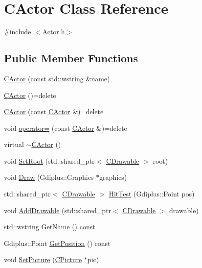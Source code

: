 \hypertarget{class_c_actor}{\section{C\+Actor Class Reference}
\label{class_c_actor}
}


{\ttfamily \#include $<$Actor.\+h$>$}

\subsection*{Public Member Functions}
\begin{DoxyCompactItemize}
\item 
\hyperlink{class_c_actor_a2849f9370b66ddeaa727c8b7045d62c2}{C\+Actor} (const std\+::wstring \&name)
\item 
\hyperlink{class_c_actor_ae7683d5f0b3edc85dc47850fa71de40f}{C\+Actor} ()=delete
\item 
\hyperlink{class_c_actor_a8af986ad4ec530967f942aaebd853632}{C\+Actor} (const \hyperlink{class_c_actor}{C\+Actor} \&)=delete
\item 
void \hyperlink{class_c_actor_aa947810cfb2f45129b501296bcad837c}{operator=} (const \hyperlink{class_c_actor}{C\+Actor} \&)=delete
\item 
virtual \hyperlink{class_c_actor_adca86a138fd9af275352336848ebad27}{$\sim$\+C\+Actor} ()
\item 
void \hyperlink{class_c_actor_af0417205281ecd3bc52a367724cc6635}{Set\+Root} (std\+::shared\+\_\+ptr$<$ \hyperlink{class_c_drawable}{C\+Drawable} $>$ root)
\item 
void \hyperlink{class_c_actor_a78048c684b231e498184d963b57fffe2}{Draw} (Gdiplus\+::\+Graphics $\ast$graphics)
\item 
std\+::shared\+\_\+ptr$<$ \hyperlink{class_c_drawable}{C\+Drawable} $>$ \hyperlink{class_c_actor_a63676c04fa760cd9fc56d85cb0542cd1}{Hit\+Test} (Gdiplus\+::\+Point pos)
\item 
void \hyperlink{class_c_actor_a943e05a65bde59998079ab647ec0e7ec}{Add\+Drawable} (std\+::shared\+\_\+ptr$<$ \hyperlink{class_c_drawable}{C\+Drawable} $>$ drawable)
\item 
std\+::wstring \hyperlink{class_c_actor_aee85c15c97f5f9652cb4c083772798e6}{Get\+Name} () const 
\item 
Gdiplus\+::\+Point \hyperlink{class_c_actor_ae3c531320a80c83419b4239c3227192b}{Get\+Position} () const 
\item 
void \hyperlink{class_c_actor_a4af7bf0c9c0bf4a41a99ad270ac4f1ca}{Set\+Picture} (\hyperlink{class_c_picture}{C\+Picture} $\ast$pic)

\end{DoxyCompactItemize}
